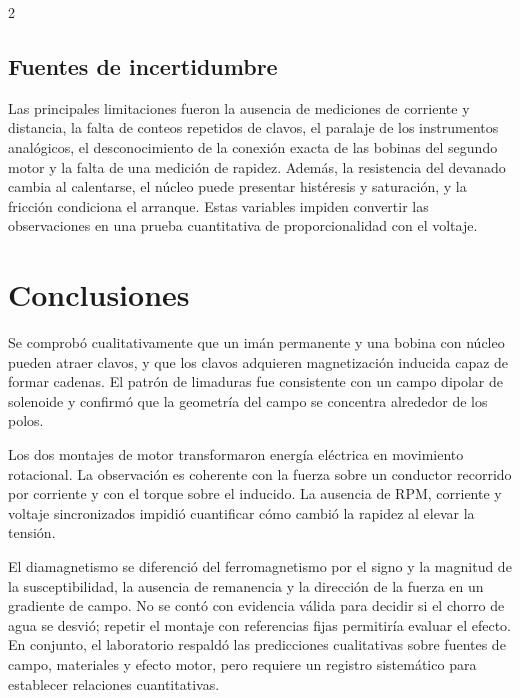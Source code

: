 \documentclass[10pt,letterpaper]{article}
\begin{document}
\begin{multicols}{2}
\subsection{Fuentes de incertidumbre}

Las principales limitaciones fueron la ausencia de mediciones de corriente y distancia, la falta de conteos repetidos de clavos, el paralaje de los instrumentos analógicos, el desconocimiento de la conexión exacta de las bobinas del segundo motor y la falta de una medición de rapidez. Además, la resistencia del devanado cambia al calentarse, el núcleo puede presentar histéresis y saturación, y la fricción condiciona el arranque. Estas variables impiden convertir las observaciones en una prueba cuantitativa de proporcionalidad con el voltaje.

\section{Conclusiones}

Se comprobó cualitativamente que un imán permanente y una bobina con núcleo pueden atraer clavos, y que los clavos adquieren magnetización inducida capaz de formar cadenas. El patrón de limaduras fue consistente con un campo dipolar de solenoide y confirmó que la geometría del campo se concentra alrededor de los polos.

Los dos montajes de motor transformaron energía eléctrica en movimiento rotacional. La observación es coherente con la fuerza sobre un conductor recorrido por corriente y con el torque sobre el inducido. La ausencia de RPM, corriente y voltaje sincronizados impidió cuantificar cómo cambió la rapidez al elevar la tensión.

El diamagnetismo se diferenció del ferromagnetismo por el signo y la magnitud de la susceptibilidad, la ausencia de remanencia y la dirección de la fuerza en un gradiente de campo. No se contó con evidencia válida para decidir si el chorro de agua se desvió; repetir el montaje con referencias fijas permitiría evaluar el efecto. En conjunto, el laboratorio respaldó las predicciones cualitativas sobre fuentes de campo, materiales y efecto motor, pero requiere un registro sistemático para establecer relaciones cuantitativas.

\end{multicols}



\end{document}
